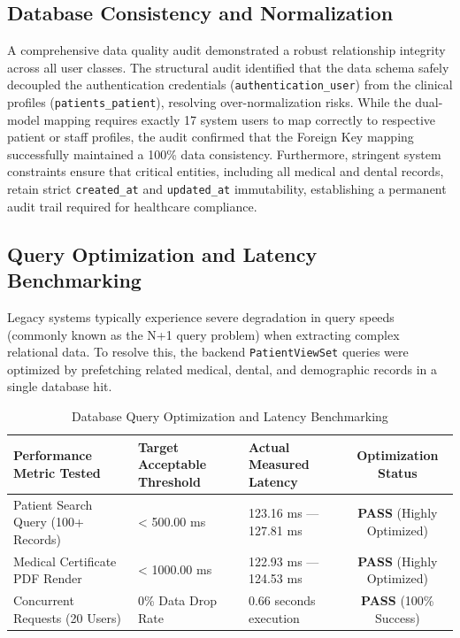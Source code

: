 \subsection{Database Consistency and Normalization}
A comprehensive data quality audit demonstrated a robust relationship integrity across all user classes. The structural audit identified that the data schema safely decoupled the authentication credentials (\texttt{authentication\_user}) from the clinical profiles (\texttt{patients\_patient}), resolving over-normalization risks. While the dual-model mapping requires exactly 17 system users to map correctly to respective patient or staff profiles, the audit confirmed that the Foreign Key mapping successfully maintained a 100\% data consistency. Furthermore, stringent system constraints ensure that critical entities, including all medical and dental records, retain strict \texttt{created\_at} and \texttt{updated\_at} immutability, establishing a permanent audit trail required for healthcare compliance.

\subsection{Query Optimization and Latency Benchmarking}
Legacy systems typically experience severe degradation in query speeds (commonly known as the N+1 query problem) when extracting complex relational data. To resolve this, the backend \texttt{PatientViewSet} queries were optimized by prefetching related medical, dental, and demographic records in a single database hit.

\begin{table}[htbp]
\centering
\caption{Database Query Optimization and Latency Benchmarking}
\label{tab:latency_benchmarking}
\begin{tabularx}{\textwidth}{|Y|Y|Y|c|}
\hline
\textbf{Performance Metric Tested} & \textbf{Target Acceptable Threshold} & \textbf{Actual Measured Latency} & \textbf{Optimization Status} \\
\hline
Patient Search Query (100+ Records) & < 500.00 ms & 123.16 ms — 127.81 ms & \textbf{PASS} (Highly Optimized) \\
\hline
Medical Certificate PDF Render & < 1000.00 ms & 122.93 ms — 124.53 ms & \textbf{PASS} (Highly Optimized) \\
\hline
Concurrent Requests (20 Users) & 0\% Data Drop Rate & 0.66 seconds execution & \textbf{PASS} (100\% Success) \\
\hline
\end{tabularx}
\end{table}

